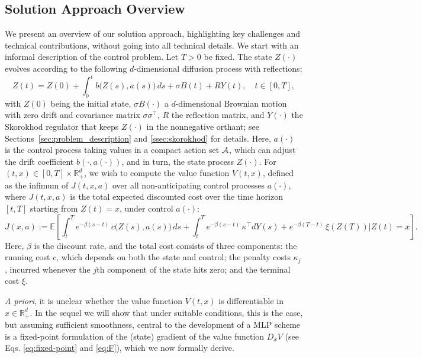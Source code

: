 \documentclass[11pt]{article}
\theoremstyle{definition}
\theoremstyle{plain}
\newcommand{\R}{\mathbb{R}}
\newcommand{\cA}{{\cal A}}
\begin{document}
\subsection{Solution Approach Overview}\label{ssec:overview}
We present an overview of our solution approach, highlighting key challenges and technical contributions, 
without going into all technical details. 
We start with an informal description of the control problem. Let $T>0$ be fixed. 
The state $Z(\cdot)$ evolves according to the following $d$-dimensional diffusion process with reflections:
\begin{equation}\label{eq:state}
Z(t) = Z(0) + \int_0^t b\bigl(Z(s), a(s)\bigr)\,ds + \sigma B(t) + RY(t), \quad t \in [0,T],
\end{equation}
with $Z(0)$ being the initial state, $\sigma B(\cdot)$ a $d$-dimensional Brownian motion with zero drift and covariance matrix $\sigma \sigma^{\top}$, 
$R$ the reflection matrix, and $Y(\cdot)$ the Skorokhod regulator that keeps $Z(\cdot)$ in the nonnegative orthant; 
see Sections~\ref{sec:problem_description} and \ref{ssec:skorokhod} for details.
Here, $a(\cdot)$ is the control process taking values in a compact action set $\cA$, 
which can adjust the drift coefficient $b(\cdot, a(\cdot))$, and in turn, the state process $Z(\cdot)$.
For $(t,x) \in [0,T] \times \R_+^d$, we wish to compute the value function $V(t,x)$, defined as the infimum of 
$J(t,x,a)$ over all non-anticipating control processes $a(\cdot)$, 
where $J(t,x,a)$ is the total expected discounted cost over the time horizon $[t,T]$ starting from $Z(t)=x$, under control $a(\cdot)$:
\begin{equation}\label{eq:cost}
J(x,a) := \mathbb{E} \left[ \int_t^T e^{-\beta (s-t)}\, c\bigl(Z(s), a(s)\bigr)\,ds + \int_t^T e^{-\beta (s-t)}\, \kappa^{\top} dY(s)
+ e^{-\beta (T-t)}\, \xi(Z(T)) \Big| Z(t)=x \right].
\end{equation}
Here, $\beta$ is the discount rate, and the total cost consists of three components: the running cost $c$, 
which depends on both the state and control; the penalty costs $\kappa_j$, incurred whenever the $j$th component of the state 
hits zero; and the terminal cost $\xi$. 

{\em A priori}, it is unclear whether the value function $V(t,x)$ is differentiable in $x \in \mathbb{R}^d_+$. 
In the sequel we will show that under suitable conditions, this is the case, but assuming sufficient smoothness, 
central to the development of a MLP scheme is a fixed-point formulation of the (state) gradient of the value function $D_x V$ 
(see Eqs. \eqref{eq:fixed-point} and \eqref{eq:F}), which we now formally derive. 
\end{document}
